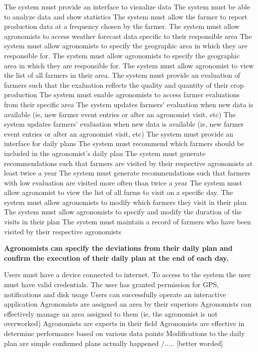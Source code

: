 \begin{itemize}
\begin{itemize}
 The system must provide an interface to visualize data
 The system must be able to analyze data and show statistics
 The system must allow the farmer to report production data at a frequency chosen by the farmer.
 The system must allow agronomists to access weather forecast data specific to their responsible area
 The system must allow agronomists to specify the geographic area in which they are responsible for.
 The system must allow agronomists to specify the geographic area in which they are responsible for.
  The system must allow agronomist to view the list of all farmers in their area.
  The system must provide an evaluation of farmers such that the exaluation reflects the quality and quantity of their crop production
  The system must enable agronomists to access farmer evaluations from their specific area
  The system updates farmers' evaluation when new data is available (ie, new farmer event entries or after an agronomist visit, etc)
  The system updates farmers' evaluation when new data is available (ie, new farmer event entries or after an agronomist visit, etc)
  The system must provide an interface for daily plans
  The system must recommend which farmers should be included in the agronomist's daily plan
  The system must generate recommendations such that farmers are visited by their respective agronomists at least twice a year
  The system must generate recommendations such that farmers with low evaluation are visited more often than twice a year
  The system must allow agronomist to view the list of all farms to visit on a specific day.
  The system must allow agronomists to modify which farmers they visit in their plan
  The system must allow agronomists to specify and modify the duration of the visits in their plan
  The system must maintain a record of farmers who have been visited by their respective agronomists
\end{itemize}

 \textbf{Agronomists can specify the deviations from their daily plan and confirm the execution of their daily plan at the end of each day.}
\begin{itemize}
  Users must have a device connected to internet.
 To access to the system the user must have valid credentials.
 The user has granted permission for GPS, notifications and disk usage
 Users can successfully operate an interactive application
 Agronomists are assigned an area by their superiors
 Agronomists can effectively manage an area assigned to them (ie, the agronomist is not overworked)
 Agronomists are experts in their field
 Agronomists are effective in determine performance based on various data points
 Modifications to the daily plan are simple
 confirmed plans actually happened /..... [better worded]



\end{itemize}
\end{itemize}
